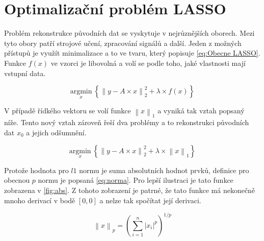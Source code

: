 \documentclass[FM,BP]{tulthesis}
\newcounter{Vzorce}
\begin{document}
\section{Optimalizační problém LASSO}
Problém rekonstrukce původních dat se vyskytuje v nejrůznějších oborech. Mezi tyto obory patří strojové učení, zpracování signálů a další. Jeden z možných přístupů je využít minimalizace a to ve tvaru, který popisuje \ref{eq:Obecne LASSO}. Funkce $f(x)$ ve vzorci je libovolná a volí se podle toho, jaké vlastnosti mají vstupní data. 

\begin{equation} \label{eq:Obecne LASSO} \tag{Vzorec \theVzorce}
\underset{x} {\mathrm{argmin}} ~\left\{\left\|y-A \times x\right\| ^2 _2+ \lambda \times f(x)\right\}
\end{equation}

V případě řídkého vektoru se volí funkce $\left\|x\right\|_1$ a vyniká tak vztah popsaný níže. Tento nový vztah zároveň řeší dva problémy a to rekonstrukci původních dat $x_0$ a jejich odšumnění.

\begin{equation} \label{eq:Konkretni LASSO} \tag{Vzorec \theVzorce}
\underset{x} {\mathrm{argmin}} ~\left\{\left\|y-A \times x\right\| ^2 _2+ \lambda \times \left\|x\right\|_1\right\}
\end{equation}

Protože hodnota pro $l1$ normu je suma absolutních hodnot prvků, definice pro obecnou $p$ normu je popsaná \ref{eq:norma}. Pro lepší ilustraci je tato funkce zobrazena v \ref{fig:abs}. Z tohoto zobrazení je patrné, že tato funkce má nekonečně mnoho derivací v bodě $[0,0]$ a nelze tak spočítat její derivaci.

\begin{equation} \label{eq:norma} \tag{Vzorec \theVzorce}
\left\|x\right\|_p = \left(\sum_{i=1}^{n} \left|x_i\right|^p\right)^{1/p}
\end{equation}
\end{document}
